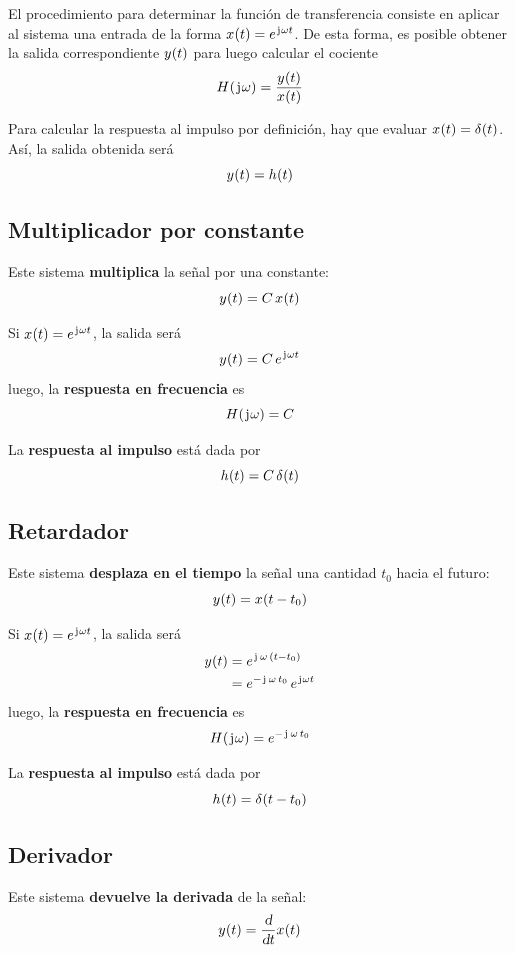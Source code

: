 El procedimiento para determinar la función de transferencia consiste en aplicar al sistema una entrada de la forma \( \fx[x]{t} = \complexExp \).
De esta forma, es posible obtener la salida correspondiente \( \fx[y]{t} \) para luego calcular el cociente
\[
    \fx[H]{\iu \omega} = \frac{\fx[y]{t}}{\fx[x]{t}}
\]

Para calcular la respuesta al impulso por definición, hay que evaluar $\fx[x]{t} = \fx[\delta]{t}$.
Así, la salida obtenida será
\[
    \fx[y]{t} = \fx[h]{t}
\]

\subsection{Multiplicador por constante}

Este sistema \textbf{multiplica} la señal por una constante:
\[
    \fx[y]{t} = C \, \fx[x]{t}
\]

Si $\fx[x]{t} = \complexExp$, la salida será
\[
    \fx[y]{t} = C \, \complexExp
\]
luego, la \textbf{respuesta en frecuencia} es
\[
    \fx[H]{\iu \omega} = C
\]

La \textbf{respuesta al impulso} está dada por
\[
    \fx[h]{t} = C \, \fx[\delta]{t}
\]

\subsection{Retardador}

Este sistema \textbf{desplaza en el tiempo} la señal una cantidad $t_0$ hacia el futuro:
\[
    \fx[y]{t} = \fx[x]{t - t_0}
\]

Si $\fx[x]{t} = \complexExp$, la salida será
\begin{align*}
    \fx[y]{t}
    & = e^{\iu \, \omega \, (t - t_0)}
    \\
    & = e^{-\iu \, \omega \, t_0} \, \complexExp
\end{align*}
luego, la \textbf{respuesta en frecuencia} es
\[
    \fx[H]{\iu \omega} = e^{- \iu \, \omega \, t_0}
\]

La \textbf{respuesta al impulso} está dada por
\[
    \fx[h]{t} = \fx[\delta]{t - t_0}
\]

\subsection{Derivador}

Este sistema \textbf{devuelve la derivada} de la señal:
\[
    \fx[y]{t} = \frac{\dif}{\dif t} \fx[x]{t}
\]

